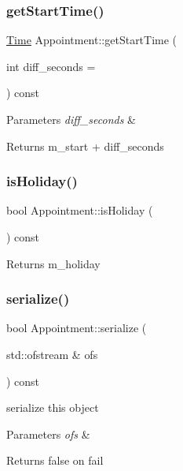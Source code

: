 \subsubsection{\texorpdfstring{get\+Start\+Time()}{getStartTime()}}
{\footnotesize\ttfamily \hyperlink{classTime}{Time} Appointment\+::get\+Start\+Time (\begin{DoxyParamCaption}\item[{int}]{diff\+\_\+seconds = {} }\end{DoxyParamCaption}) const}


\begin{DoxyParams}{Parameters}
{\em diff\+\_\+seconds} & \\
\hline
\end{DoxyParams}
\begin{DoxyReturn}{Returns}
m\+\_\+start + diff\+\_\+seconds 
\end{DoxyReturn}
\mbox{\label{classAppointment_a0307e814d106ba2b2314a28a9701efae}} 
\subsubsection{\texorpdfstring{is\+Holiday()}{isHoliday()}}
{\footnotesize\ttfamily bool Appointment\+::is\+Holiday (\begin{DoxyParamCaption}{ }\end{DoxyParamCaption}) const}

\begin{DoxyReturn}{Returns}
m\+\_\+holiday 
\end{DoxyReturn}
\mbox{\label{classAppointment_a2542a8dd24e926a2531f1d88bbf4dd88}} 
\subsubsection{\texorpdfstring{serialize()}{serialize()}}
{\footnotesize\ttfamily bool Appointment\+::serialize (\begin{DoxyParamCaption}\item[{std\+::ofstream \&}]{ofs }\end{DoxyParamCaption}) const}

serialize this object 
\begin{DoxyParams}{Parameters}
{\em ofs} & \\
\hline
\end{DoxyParams}
\begin{DoxyReturn}{Returns}
false on fail 
\end{DoxyReturn}
\mbox{\label{classAppointment_a0a69e652f7d3fa5091330a92479749a6}} 
